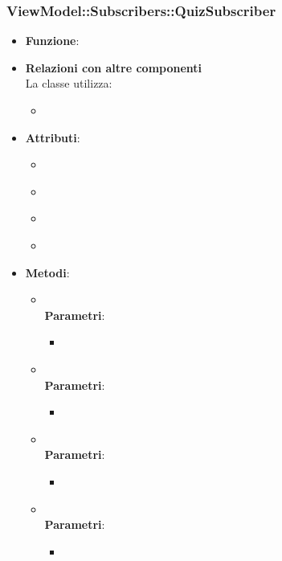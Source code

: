 \subsubsection{ViewModel::Subscribers::QuizSubscriber}
\begin{itemize}
\item\textbf{Funzione}:
\item\textbf{Relazioni con altre componenti}\\
La classe utilizza:
	\begin{itemize}
		\item
	\end{itemize}
\item\textbf{Attributi}:
	\begin{itemize}
		\item\code{}\\
		\item\code{}\\
		\item\code{}\\
		\item\code{}\\
	\end{itemize}
\item\textbf{Metodi}:
	\begin{itemize}
		\item\code{}\\
		\textbf{Parametri}:
			\begin{itemize}
				\item\code{}\\
			\end{itemize}
		\item\code{}\\
		\textbf{Parametri}:
			\begin{itemize}
				\item\code{}\\
			\end{itemize}
		\item\code{}\\
		\textbf{Parametri}:
			\begin{itemize}
				\item\code{}\\
			\end{itemize}
		\item\code{}\\
		\textbf{Parametri}:
			\begin{itemize}
				\item\code{}\\
			\end{itemize}
	\end{itemize}
\end{itemize}

